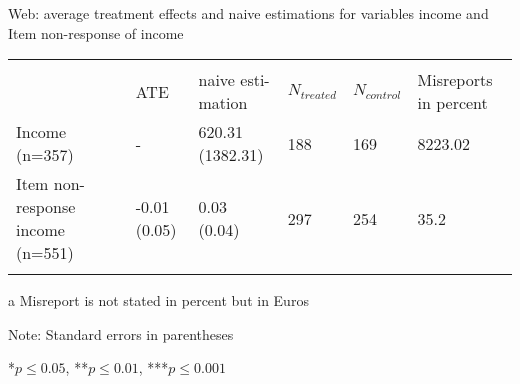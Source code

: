 \begin{threeparttable}[H]
	\centering
	\singlespacing
	\caption{Web: average treatment effects and naive estimations for variables income and Item non-response of income}
	\label{tab:inc_and_for_web}
	\begin{tabularx}{\textwidth}{@{}Xp{0.1cm}p{1.5cm}p{1.5cm}p{1cm}p{1cm}p{1.5cm}}
		&               &     &       &     &    &       \\
		& & ATE & naive \newline esti-mation & \(N_{treated}\) & \(N_{control}\) & Misreports \newline in \newline percent \\
		\midrule\addlinespace
		Income (n=357)& &-    &620.31 \newline (1382.31) &188 & 169 &8223.02\tnote{a}  \\ \addlinespace \addlinespace
		Item non-response income (n=551) &        &-0.01 \newline (0.05)    &0.03 \newline (0.04) &297 &254&35.2                 \\  \addlinespace
		\bottomrule                         
	\end{tabularx}
	\begin{tablenotes}
		\begin{footnotesize}
			\item[a] Misreport is not stated in percent but in Euros
			\item{Note: Standard errors in parentheses}
			\item{*\(p \le 0.05\), **\(p \le 0.01\), ***\(p \le 0.001\)}
		\end{footnotesize}
	\end{tablenotes}
\end{threeparttable}
